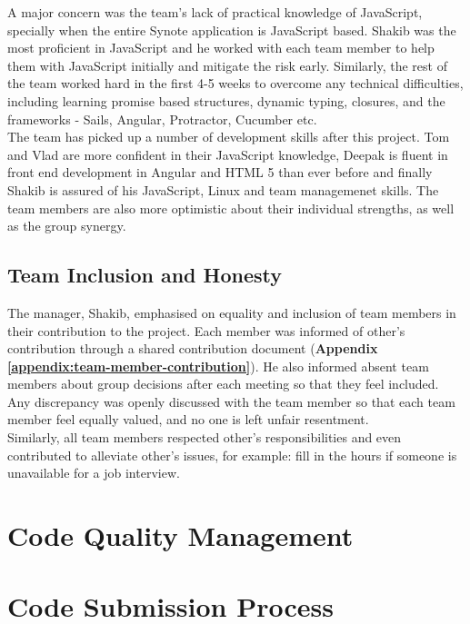 A major concern was the team's lack of practical knowledge of JavaScript, specially when the entire Synote application is JavaScript based. Shakib was the most proficient in JavaScript and he worked with each team member to help them with JavaScript initially and mitigate the risk early. Similarly, the rest of the team worked hard in the first 4-5 weeks to overcome any technical difficulties, including learning promise based structures, dynamic typing, closures, and the frameworks - Sails, Angular, Protractor, Cucumber etc.\\

The team has picked up a number of development skills after this project. Tom and Vlad are more confident in their JavaScript knowledge, Deepak is fluent in front end development in Angular and HTML 5 than ever before and finally Shakib is assured of his JavaScript, Linux and team managemenet skills. The team members are also more optimistic about their individual strengths, as well as the group synergy.

\subsection{Team Inclusion and Honesty}
\label{subsec:team-inclusion}
The manager, Shakib, emphasised on equality and inclusion of team members in their contribution to the project. Each member was informed of other's contribution through a shared contribution document (\textbf{Appendix \ref{appendix:team-member-contribution}}). He also informed absent team members about group decisions after each meeting so that they feel included. Any discrepancy was openly discussed with the team member so that each team member feel equally valued, and no one is left unfair resentment.\\

Similarly, all team members respected other's responsibilities and even contributed to alleviate other's issues, for example: fill in the hours if someone is unavailable for a job interview.


\section{Code Quality Management}
\label{sec:code-quality-management}


\section{Code Submission Process}
\label{sec:code-submission-process}
